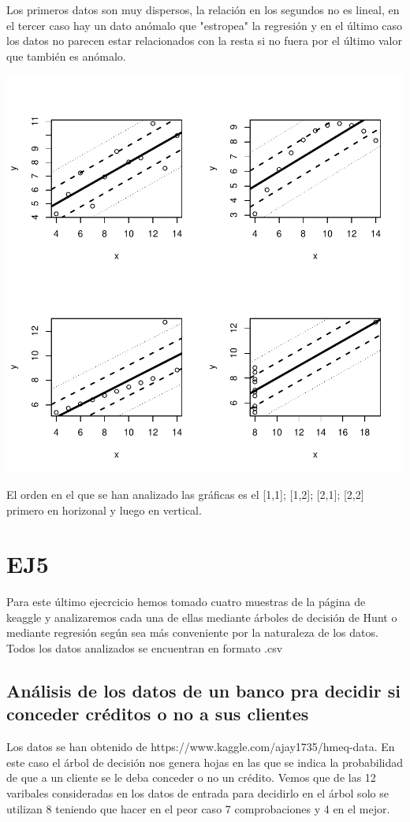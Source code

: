 \documentclass [a4paper] {article}
\begin{document}
Los primeros datos son muy dispersos,
la relación en los segundos no es lineal,
en el tercer caso hay un dato anómalo que "estropea" la regresión y
en el último caso los datos no parecen estar relacionados con la resta si no fuera por el último valor que también es anómalo.
\begin{center}
\includegraphics{entrega-plot_regresion4}
\end{center}
El orden en el que se han analizado las gráficas es el [1,1]; [1,2]; [2,1]; [2,2] primero en horizonal y luego en vertical.

\newpage
\section{EJ5}
Para este último ejecrcicio hemos tomado cuatro muestras de la página de keaggle y analizaremos cada una de ellas mediante árboles de decisión de Hunt
o mediante regresión según sea más conveniente por la naturaleza de los datos.
Todos los datos analizados se encuentran en formato .csv

\subsection{Análisis de los datos de un banco pra decidir si conceder créditos o no a sus clientes}
Los datos se han obtenido de https://www.kaggle.com/ajay1735/hmeq-data.
En este caso el árbol de decisión nos genera hojas en las que se indica la probabilidad de que a un cliente se le deba conceder o no un crédito.
Vemos que de las 12 varibales consideradas en los datos de entrada para decidirlo en el árbol solo se utilizan 8 teniendo que hacer en el peor caso 7 comprobaciones y 4 en el mejor.
\end{document}
